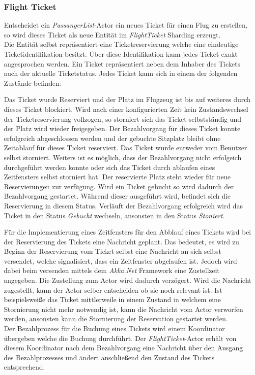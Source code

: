 \subsubsection{Flight Ticket}
Entscheidet ein \textit{PassangerList}-Actor ein neues Ticket für einen Flug zu erstellen, so wird dieses Ticket als neue Entität im \textit{FlightTicket} Sharding erzeugt. \\
Die Entität selbst repräsentiert eine Ticketreservierung welche eine eindeutige Ticketidentifikation besitzt. Über diese Identifikation kann jedes Ticket exakt angesprochen werden. Ein Ticket repräsentiert neben dem Inhaber des Tickets auch der aktuelle Ticketstatus. Jedes Ticket kann sich in einem der folgenden Zustände befinden:
\begin{enumerate}
     Das Ticket wurde Reserviert und der Platz im Flugzeug ist bis auf weiteres durch dieses Ticket blockiert. Wird nach einer konfigurierten Zeit kein Zustandswechsel der Ticketreservierung vollzogen, so storniert sich das Ticket selbstständig und der Platz wird wieder freigegeben.
     Der Bezahlvorgang für dieses Ticket konnte erfolgreich abgeschlossen werden und der gebuchte Sitzplatz bleibt ohne Zeitablauf für dieses Ticket reserviert.
     Das Ticket wurde entweder vom Benutzer selbst storniert. Weiters ist es möglich, dass der Bezahlvorgang nicht erfolgeich durchgeführt werden konnte oder sich das Ticket durch ablaufen eines Zeitfensters selbst storniert hat. Der reservierte Platz steht wieder für neue Reservierungen zur verfügung.
     Wird ein Ticket gebucht so wird dadurch der Bezahlvorgang gestartet. Während dieser ausgeführt wird, befindet sich die Reservierung in diesem Status. Verläuft der Bezahlvorgang erfolgreich wird das Ticket in den Status \textit{Gebucht} wechseln, ansonsten in den Status \textit{Stoniert}.
\end{enumerate}
Für die Implementierung eines Zeitfensters für den Abblauf eines Tickets wird bei der Reservierung des Tickets eine Nachricht geplant. Das bedeutet, es wird zu Beginn der Reservierung vom Ticket selbst eine Nachricht an sich selbst versendet, welche signalisiert, dass ein Zeitfenster abgelaufen ist. Jedoch wird dabei beim versenden mittels dem \textit{Akka.Net} Framework eine Zustellzeit angegeben. Die Zustellung zum Actor wird dadurch verzögert. Wird die Nachricht zugestellt, kann der Actor selber entscheiden ob sie noch relevant ist. Ist beispielsweiße das Ticket mittlerweile in einem Zustand in welchem eine Stornierung nicht mehr notwendig ist, kann die Nachricht vom Actor verworfen werden, ansonsten kann die Stornierung der Reservation gestartet werden. \\
Der Bezahlprozess für die Buchung eines Tickets wird einem Koordinator übergeben welche die Buchung durchführt. Der \textit{FlightTicket}-Actor erhält von diesem Koordinator nach dem Bezahlvorgang eine Nachricht über den Ausgang des Bezahlprozesses und ändert anschließend den Zustand des Tickets entsprechend.

